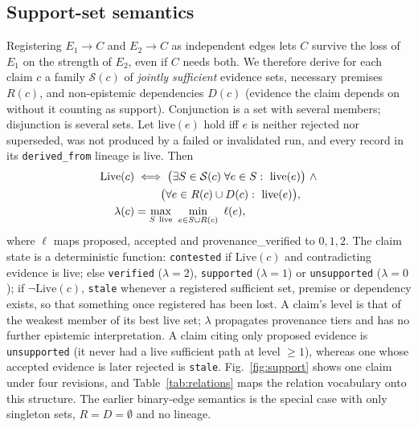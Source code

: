 \documentclass[journal]{IEEEtran}
\begin{document}
\subsection{Support-set semantics}
\label{sec:support}
Registering $E_1\!\to\! C$ and $E_2\!\to\! C$ as independent edges lets $C$ survive the loss of $E_1$ on the strength of $E_2$, even if $C$ needs both. We therefore derive for each claim $c$ a family $\mathcal{S}(c)$ of \emph{jointly sufficient} evidence sets, necessary premises $R(c)$, and non-epistemic dependencies $D(c)$ (evidence the claim depends on without it counting as support). Conjunction is a set with several members; disjunction is several sets. Let $\mathrm{live}(e)$ hold iff $e$ is neither rejected nor superseded, was not produced by a failed or invalidated run, and every record in its \texttt{derived\_from} lineage is live. Then
\begin{align}
\mathrm{Live}(c) &\iff \big(\exists S\in\mathcal{S}(c)\;\forall e\in S:\ \mathrm{live}(e)\big)\ \wedge\notag\\ &\qquad\ \big(\forall e\in R(c)\cup D(c):\ \mathrm{live}(e)\big),\label{eq:live}\\
\lambda(c) &= \max_{S\ \text{live}}\ \min_{e\in S\cup R(c)}\ \ell(e),\label{eq:level}
\end{align}
where $\ell$ maps proposed, accepted and provenance\_verified to $0,1,2$. The claim state is a deterministic function: \texttt{contested} if $\mathrm{Live}(c)$ and contradicting evidence is live; else \texttt{verified} ($\lambda\!=\!2$), \texttt{supported} ($\lambda\!=\!1$) or \texttt{unsupported} ($\lambda\!=\!0$); if $\neg\mathrm{Live}(c)$, \texttt{stale} whenever a registered sufficient set, premise or dependency exists, so that something once registered has been lost. A claim's level is that of the weakest member of its best live set; $\lambda$ propagates provenance tiers and has no further epistemic interpretation. A claim citing only proposed evidence is \texttt{unsupported} (it never had a live sufficient path at level $\ge1$), whereas one whose accepted evidence is later rejected is \texttt{stale}. Fig.~\ref{fig:support} shows one claim under four revisions, and Table~\ref{tab:relations} maps the relation vocabulary onto this structure. The earlier binary-edge semantics is the special case with only singleton sets, $R\!=\!D\!=\!\emptyset$ and no lineage.
\end{document}
